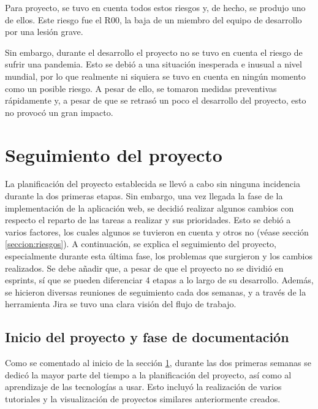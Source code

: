\documentclass[pdftex,11pt,a4paper]{book}
\begin{document}


Para proyecto, se tuvo en cuenta todos estos riesgos y, de hecho, se produjo uno de ellos. Este riesgo fue el R00, la baja de un miembro del equipo de desarrollo por una lesión grave.

Sin embargo, durante el desarrollo el proyecto no se tuvo en cuenta el riesgo de sufrir una pandemia. Esto se debió a una situación inesperada e inusual a nivel mundial, por lo que realmente ni siquiera se tuvo en cuenta en ningún momento como un posible riesgo. A pesar de ello, se tomaron medidas preventivas rápidamente y, a pesar de que se retrasó un poco el desarrollo del proyecto, esto no provocó un gran impacto.


\section{Seguimiento del proyecto} \label{seccion:seguimiento-proyecto}

La planificación del proyecto establecida se llevó a cabo sin ninguna incidencia durante la dos primeras etapas. Sin embargo, una vez llegada la fase de la implementación de la aplicación web, se decidió realizar algunos cambios con respecto el reparto de las tareas a realizar y sus prioridades. Esto se debió a varios factores, los cuales algunos se tuvieron en cuenta y otros no (véase sección \ref{seccion:riesgos}). A continuación, se explica el seguimiento del proyecto, especialmente durante esta última fase, los problemas que surgieron y los cambios realizados. Se debe añadir que, a pesar de que el proyecto no se dividió en esprints, sí que se pueden diferenciar 4 etapas a lo largo de su desarrollo. Además, se hicieron diversas reuniones de seguimiento cada dos semanas, y a través de la herramienta Jira se tuvo una clara visión del flujo de trabajo.

\subsection{Inicio del proyecto y fase de documentación} \label{subseccion:seguimiento-documentacion}

Como se comentado al inicio de la sección \ref{seccion:seguimiento-proyecto}, durante las dos primeras semanas se dedicó la mayor parte del tiempo a la planificación del proyecto, así como al aprendizaje de las tecnologías a usar. Esto incluyó la realización de varios tutoriales y la visualización de proyectos similares anteriormente creados. 
\end{document}
